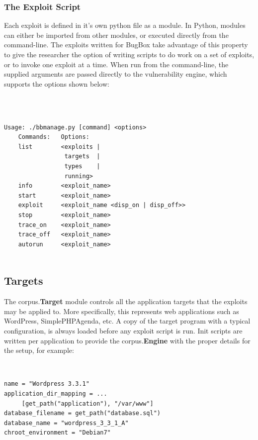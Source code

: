 \documentclass[letterpaper,twocolumn,10pt]{article}
\begin{document}
\subsubsection{The Exploit Script}

Each exploit is defined in it's own python file as a module. In Python, modules can either be imported from other modules, or executed directly from the command-line. The exploits written for BugBox take advantage of this property to give the researcher the option of writing scripts to do work on a set of exploits, or to invoke one exploit at a time. When run from the command-line, the supplied arguments are passed directly to the vulnerability engine, which supports the options shown below: 


{\tt \small
\begin{verbatim}

Usage: ./bbmanage.py [command] <options>
    Commands:   Options:
    list        <exploits | 
                 targets  | 
                 types    | 
                 running>
    info        <exploit_name>
    start       <exploit_name>
    exploit     <exploit_name <disp_on | disp_off>>
    stop        <exploit_name>
    trace_on    <exploit_name>
    trace_off   <exploit_name>
    autorun     <exploit_name>


\end{verbatim}
}

\subsection{Targets}

   The corpus.{\bf Target} module controls all the application targets that the exploits may be applied to.  More specifically, this represents web applications such as WordPress, SimplePHPAgenda, etc. A copy of the target program with a typical configuration, is always loaded before any exploit script is run.  Init scripts are written per application to provide the corpus.{\bf Engine} with the proper details for the setup, for example:

{\tt \small
\begin{verbatim}
name = "Wordpress 3.3.1"
application_dir_mapping = ...
     [get_path("application"), "/var/www"]
database_filename = get_path("database.sql")
database_name = "wordpress_3_3_1_A"
chroot_environment = "Debian7"
\end{verbatim}
} 
\end{document}
